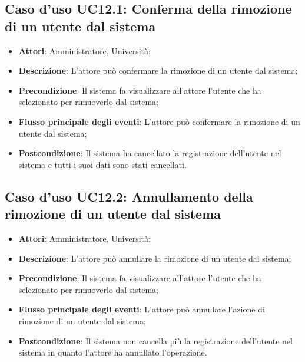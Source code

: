 \subsection{Caso d'uso \texorpdfstring{UC12.1}{UC12.1}: Conferma della rimozione di un utente dal sistema}
\begin{itemize}
	\item \textbf{Attori}: Amministratore, Università;
	\item \textbf{Descrizione}: L'attore può confermare la rimozione di un utente dal sistema;
	\item \textbf{Precondizione}: Il sistema fa visualizzare all'attore l'utente che ha selezionato per rimuoverlo dal sistema;
	\item \textbf{Flusso principale degli eventi}: L'attore può confermare la rimozione di un utente dal sistema;
	\item \textbf{Postcondizione}: Il sistema ha cancellato la registrazione dell'utente nel sistema e tutti i suoi dati sono stati cancellati.
\end{itemize}
\subsection{Caso d'uso \texorpdfstring{UC12.2}{UC12.2}: Annullamento della rimozione di un utente dal sistema}
\begin{itemize}
	\item \textbf{Attori}: Amministratore, Università;
	\item \textbf{Descrizione}: L'attore può annullare la rimozione di un utente dal sistema;
	\item \textbf{Precondizione}: Il sistema fa visualizzare all'attore l'utente che ha selezionato per rimuoverlo dal sistema;
	
	\item \textbf{Flusso principale degli eventi}: L'attore può annullare l'azione di rimozione di un utente dal sistema;
	\item \textbf{Postcondizione}: Il sistema non cancella più la registrazione dell'utente nel sistema in quanto l'attore ha annullato l'operazione.
	
\end{itemize}
